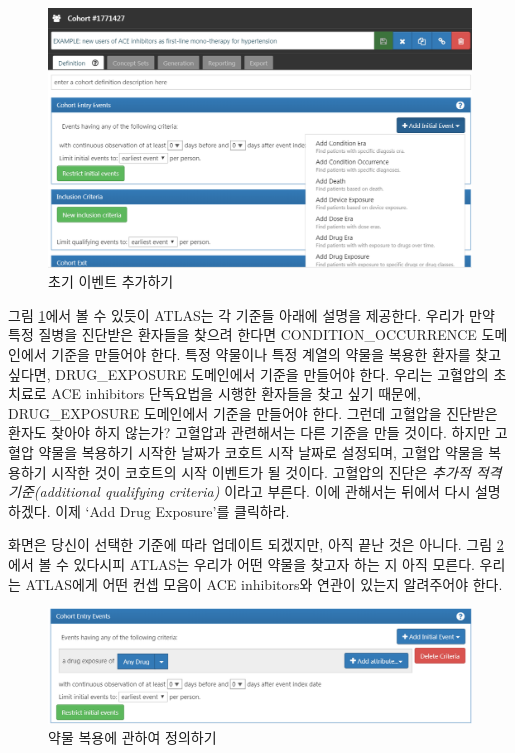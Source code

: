 \documentclass[11pt]{book}
\theoremstyle{definition}
\theoremstyle{definition}
\theoremstyle{definition}
\theoremstyle{remark}
\begin{document}
\begin{figure}

{\centering \includegraphics[width=1\linewidth]{images/Cohorts/ATLAS-initialevent} 

}

\caption{초기 이벤트 추가하기}\label{fig:ATLASinitialevent}
\end{figure}

그림 \ref{fig:ATLASinitialevent}에서 볼 수 있듯이 ATLAS는 각 기준들
아래에 설명을 제공한다. 우리가 만약 특정 질병을 진단받은 환자들을 찾으려
한다면 CONDITION\_OCCURRENCE 도메인에서 기준을 만들어야 한다. 특정
약물이나 특정 계열의 약물을 복용한 환자를 찾고 싶다면, DRUG\_EXPOSURE
도메인에서 기준을 만들어야 한다. 우리는 고혈압의 초치료로 ACE inhibitors
단독요법을 시행한 환자들을 찾고 싶기 때문에, DRUG\_EXPOSURE 도메인에서
기준을 만들어야 한다. 그런데 고혈압을 진단받은 환자도 찾아야 하지
않는가? 고혈압과 관련해서는 다른 기준을 만들 것이다. 하지만 고혈압
약물을 복용하기 시작한 날짜가 코호트 시작 날짜로 설정되며, 고혈압 약물을
복용하기 시작한 것이 코호트의 시작 이벤트가 될 것이다. 고혈압의 진단은
\emph{추가적 적격 기준(additional qualifying criteria)} 이라고 부른다.
이에 관해서는 뒤에서 다시 설명하겠다. 이제 `Add Drug Exposure'를
클릭하라.

화면은 당신이 선택한 기준에 따라 업데이트 되겠지만, 아직 끝난 것은
아니다. 그림 \ref{fig:ATLASdrugexposure}에서 볼 수 있다시피 ATLAS는
우리가 어떤 약물을 찾고자 하는 지 아직 모른다. 우리는 ATLAS에게 어떤
컨셉 모음이 ACE inhibitors와 연관이 있는지 알려주어야 한다.

\begin{figure}

{\centering \includegraphics[width=1\linewidth]{images/Cohorts/ATLAS-drugexposure} 

}

\caption{약물 복용에 관하여 정의하기}\label{fig:ATLASdrugexposure}
\end{figure}
\end{document}
